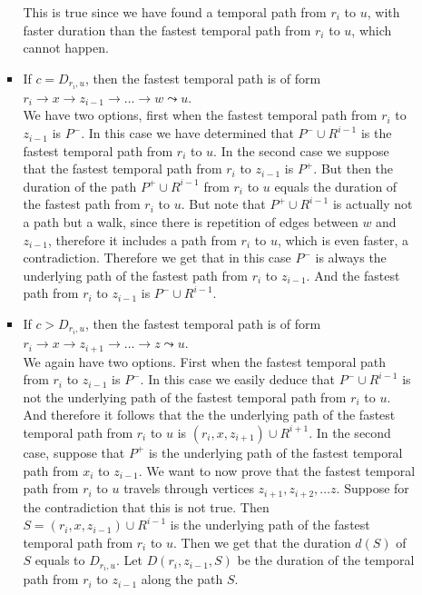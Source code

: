 \documentclass[a4paper,UKenglish,cleveref, autoref, thm-restate]{lipics-v2021}
\begin{document}
\begin{enumerate}[(i)]
\begin{enumerate}[(a)]
\begin{itemize}
            This is true since we have found a temporal path from $r_i$ to $u$, with faster duration than the fastest temporal path from $r_i$ to $u$,
            which cannot happen.
            \item  If $c = D_{r_i,u}$, then 
            the fastest temporal path is of form $r_i \rightarrow x \rightarrow z_{i-1} \rightarrow \dots \rightarrow w \leadsto u$.\\
            We have two options, first when the fastest temporal path from $r_i$ to $z_{i-1}$ is $P^-$.
            In this case we have determined that $P^- \cup R^{i-1}$ is the fastest temporal path from $r_i$ to $u$.
            In the second case we suppose that the fastest temporal path from $r_i$ to $z_{i-1}$ is $P^+$.
            But then the duration of the path $P^+ \cup R^{i-1}$ from $r_i$ to $u$ equals the duration of the fastest path from $r_i$ to $u$. But note that $P^+ \cup R^{i-1}$ is actually not a path but a walk, since there is repetition of edges between $w$ and $z_{i-1}$,
            therefore it includes a path from $r_i$ to $u$, which is even faster,
            a contradiction.
            Therefore we get that in this case $P^-$ is always the underlying path of the fastest path from $r_i$ to $z_{i-1}$.
            And the fastest path from $r_i$ to $z_{i-1}$ is $P^- \cup R^{i-1}$.
            \item If $c > D_{r_i,u}$, then 
            the fastest temporal path is of form $r_i \rightarrow x \rightarrow z_{i+1} \rightarrow \dots \rightarrow z \leadsto u$.\\
            We again have two options.
            First when the fastest temporal path from $r_i$ to $z_{i-1}$ is $P^-$.
            In this case we easily deduce that $P^- \cup R^{i-1}$ is not the underlying path of the fastest temporal path from $r_i$ to $u$.
            And therefore it follows that the the underlying path of the fastest temporal path from $r_i$ to $u$ is  $(r_i, x, z_{i+1}) \cup R^{i+1}$.
            In the second case, suppose that $P^+$ is the underlying path of the fastest temporal path from $x_i$ to $z_{i-1}$.
            We want to now prove that the fastest temporal path from $r_i$ to $u$ travels through vertices $z_{i+1}, z_{i+2}, \dots z$.
            Suppose for the contradiction that this is not true. 
            Then $S = (r_i, x, z_{i-1}) \cup R^{i-1}$ is the underlying path of the fastest temporal path from $r_i$ to $u$.
            Then we get that the duration $d(S)$ of $S$ equals to $D_{r_i,u}$.
            Let $D(r_i,z_{i-1},S)$ be the duration of the temporal path from $r_i$ to $z_{i-1}$ along the path $S$.

\end{itemize}
\end{enumerate}
\end{enumerate}
\end{document}
